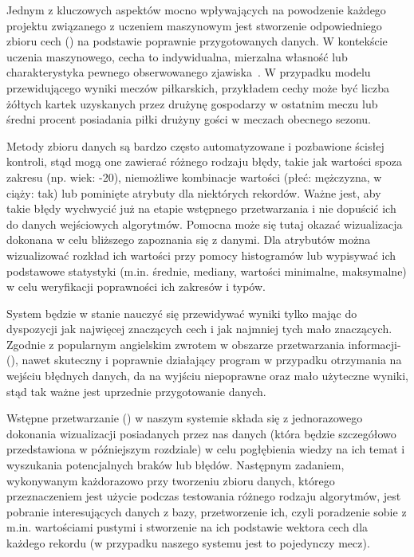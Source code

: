Jednym z kluczowych aspektów mocno wpływających na powodzenie każdego projektu związanego z uczeniem maszynowym jest stworzenie odpowiedniego zbioru cech () na podstawie poprawnie przygotowanych danych. W kontekście uczenia maszynowego, cecha to indywidualna, mierzalna własność lub charakterystyka pewnego obserwowanego zjawiska~\cite{Wiki:Feature}. W przypadku modelu przewidującego wyniki meczów piłkarskich, przykładem cechy może być liczba żółtych kartek uzyskanych przez drużynę gospodarzy w ostatnim meczu lub średni procent posiadania piłki drużyny gości w meczach obecnego sezonu.

Metody zbioru danych są bardzo często automatyzowane i pozbawione ścisłej kontroli, stąd mogą one zawierać różnego rodzaju błędy, takie jak wartości spoza zakresu (np. wiek: -20), niemożliwe kombinacje wartości (płeć: mężczyzna, w ciąży: tak) lub pominięte atrybuty dla niektórych rekordów. Ważne jest, aby takie błędy wychwycić już na etapie wstępnego przetwarzania i nie dopuścić ich do danych wejściowych algorytmów. Pomocna może się tutaj okazać wizualizacja dokonana w celu bliższego zapoznania się z danymi. Dla atrybutów można wizualizować rozkład ich wartości przy pomocy histogramów lub wypisywać ich podstawowe statystyki (m.in. średnie, mediany, wartości minimalne, maksymalne) w celu weryfikacji poprawności ich zakresów i typów.

System będzie w stanie nauczyć się przewidywać wyniki tylko mając do dyspozycji jak najwięcej znaczących cech i jak najmniej tych mało znaczących. Zgodnie z popularnym angielskim zwrotem w obszarze przetwarzania informacji-   (), nawet skuteczny i poprawnie działający program w przypadku otrzymania na wejściu błędnych danych, da na wyjściu niepoprawne oraz mało użyteczne wyniki, stąd tak ważne jest uprzednie przygotowanie danych.

Wstępne przetwarzanie () w naszym systemie składa się z jednorazowego dokonania wizualizacji posiadanych przez nas danych (która będzie szczegółowo przedstawiona w późniejszym rozdziale) w celu pogłębienia wiedzy na ich temat i wyszukania potencjalnych braków lub błędów. Następnym zadaniem, wykonywanym każdorazowo przy tworzeniu zbioru danych, którego przeznaczeniem jest użycie podczas testowania różnego rodzaju algorytmów, jest pobranie interesujących danych z bazy, przetworzenie ich, czyli poradzenie sobie z m.in. wartościami pustymi i stworzenie na ich podstawie wektora cech dla każdego rekordu (w przypadku naszego systemu jest to pojedynczy mecz). 

